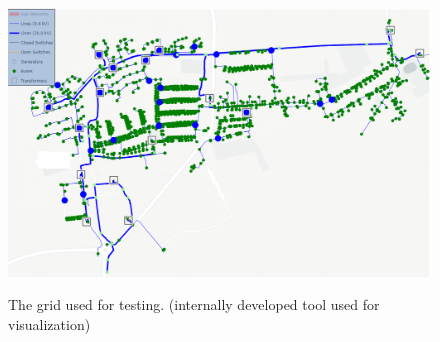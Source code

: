 \begin{figure}[h]
	\begin{centering}
		{\includegraphics[scale=0.5]{figures/experiments/enwg_mixed.png}}
		\caption{The grid used for testing. (internally developed tool used for visualization)}
		\label{fig:enwg_mixed}
	\end{centering}
\end{figure}
